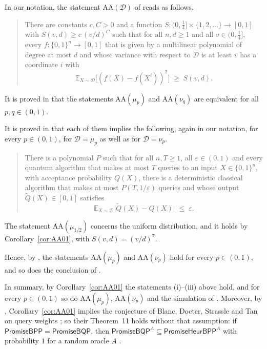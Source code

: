 \documentclass[11pt,reqno]{amsart}
\theoremstyle{definition}
\theoremstyle{remark}
\numberwithin{equation}{section}
\theoremstyle{named}
\theoremstyle{plain}
\newcommand{\E}{\mathbb{E}}
\newcommand{\eps}{\varepsilon}
\newcommand{\abs}[1]{\lvert #1\rvert}
\begin{document}
In our notation, the statement $\mathrm{AA}(\mathcal{D})$ of \cite[Definition~4.1]{GMNR} reads as
follows.

\begin{quote}
There are
constants $c,C>0$ and a function $S\colon(0,\frac14]\times\{1,2,\dots\}\to[0,1]$ with
$S(v,d)\ge c\,(v/d)^{C}$ such that for all $n,d\ge 1$ and all $v\in(0,\frac14]$, every
$f\colon\{0,1\}^{n}\to[0,1]$ that is given by a multilinear polynomial of degree at most $d$ and whose
variance with respect to $\mathcal{D}$ is at least $v$ has a coordinate $i$ with
\[
   \E_{X\sim\mathcal{D}}\bigl[(f(X)-f(X^{i}))^{2}\bigr]\;\ge\;S(v,d).
\]
\end{quote}

It is proved in
\cite[Theorem~4.3]{GMNR} that the statements $\mathrm{AA}(\mu_p)$ and $\mathrm{AA}(\nu_q)$ are
equivalent for all $p,q\in(0,1)$.

It is proved in \cite[Theorem~4.14]{GMNR} that each of them
implies the
following, again in our notation, for every $p\in(0,1)$, for $\mathcal{D}=\mu_p$ as well as for
$\mathcal{D}=\nu_p$.

\begin{quote}
There is a
polynomial $P$ such that for all $n,T\ge1$, all $\eps\in(0,1)$ and every quantum algorithm that makes
at most $T$ queries to an input $X\in\{0,1\}^{n}$, with acceptance probability $Q(X)$, there is a
deterministic classical algorithm that makes at most $P(T,1/\eps)$ queries and whose output
$\widetilde{Q}(X)\in[0,1]$ satisfies
\[
   \E_{X\sim\mathcal{D}}\abs{\widetilde{Q}(X)-Q(X)}\;\le\;\eps .
\]
\end{quote}

The statement
$\mathrm{AA}(\mu_{1/2})$ concerns the uniform distribution, and it holds by
Corollary~\ref{cor:AA01}, with $S(v,d)=(v/d)^{7}$.

Hence, by \cite[Theorem~4.3]{GMNR}, the
statements $\mathrm{AA}(\mu_p)$ and $\mathrm{AA}(\nu_p)$ hold for every $p\in(0,1)$, and so does the
conclusion of \cite[Theorem~4.14]{GMNR}.

In summary, by Corollary~\ref{cor:AA01} the statements (i)--(iii) above hold, and for every
$p\in(0,1)$ so do $\mathrm{AA}(\mu_p)$, $\mathrm{AA}(\nu_p)$ and the simulation of
\cite[Theorem~4.14]{GMNR}. Moreover, by \cite[Claim~A.1]{BDST}, Corollary~\ref{cor:AA01} implies the conjecture
of Blanc, Docter, Strassle and Tan on query weights \cite[Conjecture~1]{BDST}; so their
Theorem~11 holds without that assumption: if $\mathsf{PromiseBPP}=\mathsf{PromiseBQP}$, then
$\mathsf{PromiseBQP}^{A}\subseteq\mathsf{PromiseHeurBPP}^{A}$ with probability $1$ for a random
oracle $A$ \cite[Theorem~11]{BDST}.
\end{document}
